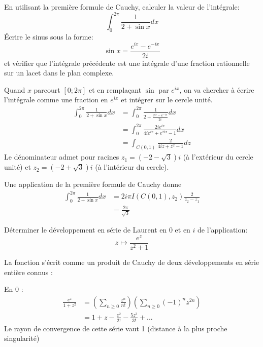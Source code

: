 \documentclass[a4paper, 12pt]{amsart}
\begin{document}
\begin{fex}
    En utilisant la première formule de Cauchy, calculer la valeur de l'intégrale:
    \[
    \int_0^{2\pi} \frac{1}{2 + \sin x} dx
    \]
    Écrire le sinus sous la forme:
    \[
\sin x =\frac{e^{ix}-e^{-ix}}{2i}
    \]
    et vérifier que l'intégrale précédente est une intégrale d'une fraction rationnelle sur un lacet dans le plan
    complexe.
\end{fex} 
Quand $x$ parcourt $[0;2\pi]$ et en remplaçant $\sin$ par $e^{ix}$, on va chercher à écrire l'intégrale comme une fraction en $e^{ix}$ et intégrer sur le cercle unité. 
\begin{align*} 
    \int_0^{2\pi} \frac{1}{2 + \sin x} dx 
    &= \int_0^{2\pi} \frac{1}{2 + \frac{e^{ix}-e^{-ix}}{2i}} dx \\ 
    &= \int_0^{2\pi} \frac{2ie^{ix}}{4ie^{ix} + e^{2ix}-1} dx \\  
    &= \int_{C(0,1)} \frac{2}{4iz + z^2 - 1} dz 
\end{align*} 
Le dénominateur admet pour racines $z_1 = (-2-\sqrt{3})i$ (à l'extérieur du cercle unité) et $z_2 = (-2+\sqrt{3})i$ (à l'intérieur du cercle). 

Une application de la première formule de Cauchy donne 
\begin{align*} 
    \int_0^{2\pi} \frac{1}{2 + \sin x} dx 
    &= 2i \pi I(C(0,1), z_2) \frac{2}{z_2-z_1} \\ 
    &= \frac{2\pi}{\sqrt{3}} 
\end{align*} 
\begin{fex} 
Déterminer le développement en série de Laurent en $0$ et en $i$ de l'application:
\[
z \mapsto \frac{e^z}{z^2+1}
\]
\end{fex} 
La fonction s'écrit comme un produit de Cauchy de deux développements en série entière connus : 

En 0 : 
\begin{align*} 
    \frac{e^z}{1+z^2} &= \left( \sum_{n \geq 0} \frac{z^n}{n!} \right) \left( \sum_{n \geq 0} (-1)^n z^{2n} \right) \\ 
    &= 1 + z - \frac{z^2}{2!} - \frac{5z^3}{3!} + ... 
\end{align*} 
Le rayon de convergence de cette série vaut 1 (distance à la plus proche singularité) 
\end{document}
